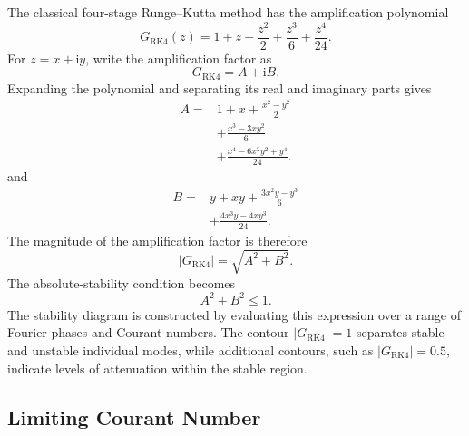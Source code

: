 The classical four-stage Runge--Kutta method has the amplification polynomial
\begin{equation}
    \boxed{
    G_{\mathrm{RK4}}(z)=1+z+\frac{z^2}{2}
    +\frac{z^3}{6}+\frac{z^4}{24}
    }.
    \label{eq:app-rk4-amplification}
\end{equation}
For $z=x+\mathrm{i}y$, write the amplification factor as
\begin{equation}
    G_{\mathrm{RK4}}=A+\mathrm{i}B.
\end{equation}
Expanding the polynomial and separating its real and imaginary parts gives
\begin{equation}
    \boxed{
    \begin{aligned}
    A={}&1+x+\frac{x^2-y^2}{2}\\
      &+\frac{x^3-3xy^2}{6}\\
      &+\frac{x^4-6x^2y^2+y^4}{24}.
    \end{aligned}
    }
    \label{eq:app-rk4-amplification-real}
\end{equation}
and
\begin{equation}
    \boxed{
    \begin{aligned}
    B={}&y+xy+\frac{3x^2y-y^3}{6}\\
      &+\frac{4x^3y-4xy^3}{24}.
    \end{aligned}
    }
    \label{eq:app-rk4-amplification-imag}
\end{equation}
The magnitude of the amplification factor is therefore
\begin{equation}
    |G_{\mathrm{RK4}}|=\sqrt{A^2+B^2}.
    \label{eq:app-rk4-amplification-magnitude}
\end{equation}
The absolute-stability condition becomes
\begin{equation}
    \boxed{A^2+B^2\leq 1}.
    \label{eq:app-rk4-stability-condition}
\end{equation}
The stability diagram is constructed by evaluating this expression over a range of Fourier phases and Courant numbers. The contour $|G_{\mathrm{RK4}}|=1$ separates stable and unstable individual modes, while additional contours, such as $|G_{\mathrm{RK4}}|=0.5$, indicate levels of attenuation within the stable region.

\subsection{Limiting Courant Number}
\label{app:rk4-upwind-cfl-limit}

